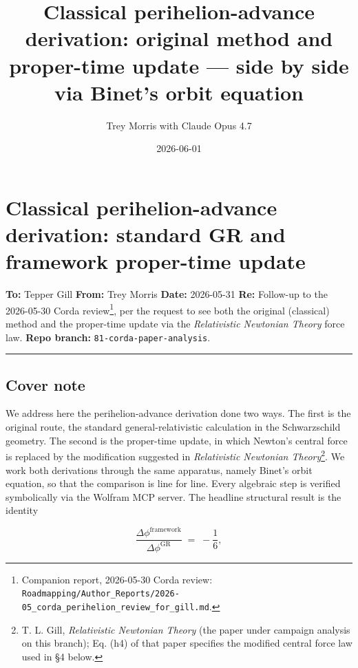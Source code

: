\documentclass[
  11pt,
]{article}
\title{Classical perihelion-advance derivation: original method and
proper-time update --- side by side via Binet's orbit equation}
\author{Trey Morris with Claude Opus 4.7}
\date{2026-06-01}
\begin{document}
\maketitle

\hypertarget{classical-perihelion-advance-derivation-standard-gr-and-framework-proper-time-update}{%
\section{Classical perihelion-advance derivation: standard GR and
framework proper-time
update}\label{classical-perihelion-advance-derivation-standard-gr-and-framework-proper-time-update}}

\textbf{To:} Tepper Gill \textbf{From:} Trey Morris \textbf{Date:}
2026-05-31 \textbf{Re:} Follow-up to the 2026-05-30 Corda
review\footnote{Companion report, 2026-05-30 Corda review:
  \texttt{Roadmapping/Author\_Reports/2026-05\_corda\_perihelion\_review\_for\_gill.md}.},
per the request to see both the original (classical) method and the
proper-time update via the \emph{Relativistic Newtonian Theory} force
law. \textbf{Repo branch:} \texttt{81-corda-paper-analysis}.

\begin{center}\rule{0.5\linewidth}{0.5pt}\end{center}

\hypertarget{cover-note}{%
\subsection{Cover note}\label{cover-note}}

We address here the perihelion-advance derivation done two ways. The
first is the original route, the standard general-relativistic
calculation in the Schwarzschild geometry. The second is the proper-time
update, in which Newton's central force is replaced by the modification
suggested in \emph{Relativistic Newtonian Theory}\footnote{T. L. Gill,
  \emph{Relativistic Newtonian Theory} (the paper under campaign
  analysis on this branch); Eq. (h4) of that paper specifies the
  modified central force law used in §4 below.}. We work both
derivations through the same apparatus, namely Binet's orbit equation,
so that the comparison is line for line. Every algebraic step is
verified symbolically via the Wolfram MCP server. The headline
structural result is the identity

\[
\frac{\Delta\phi^{\text{framework}}}{\Delta\phi^{\text{GR}}} \;=\; -\frac{1}{6}, \tag{1}
\]
\end{document}
